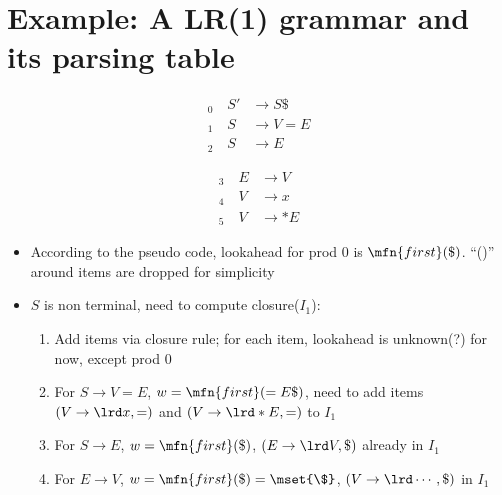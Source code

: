 \section*{Example: A LR(1) grammar and its parsing table}
\begin{minipage}{.5\linewidth}
\begin{align*}
  _0\quad S'&\to S\$  \\
  _1\quad S&\to V = E \\
  _2\quad S&\to E
\end{align*}
\end{minipage}
\begin{minipage}{.5\linewidth}
\begin{align*}
  _3\quad  E&\to V   \\
  _4\quad  V&\to x   \\
  _5\quad  V&\to *E
\end{align*}
\end{minipage}
\begin{itemize}
\item According to the pseudo code, lookahead for prod 0 is $\mfn{first}(\$)$. ``()'' around items are dropped for simplicity

  \begin{minipage}{\linewidth}
    \centering
  \end{minipage}
\item $S$ is non terminal, need to compute closure($I_1$):
  \begin{enumerate}
  \item Add items via closure rule; for each item, lookahead is unknown(?) for now, except prod 0
  \item For $S\to V = E$, $w=\mfn{first}(=E\$)$, need to add items $(V\to \lrd x, =)$ and $(V\to \lrd * E, =)$ to $I_1$
  \item For $S\to E$, $w=\mfn{first}(\$)$, $(E\to \lrd V, \$)$ already in $I_1$
  \item For $E\to V$, $w=\mfn{first}(\$) = \mset{\$}$, $(V\to \lrd\cdots, \$)$ in $I_1$
  \end{enumerate}
\end{itemize}
